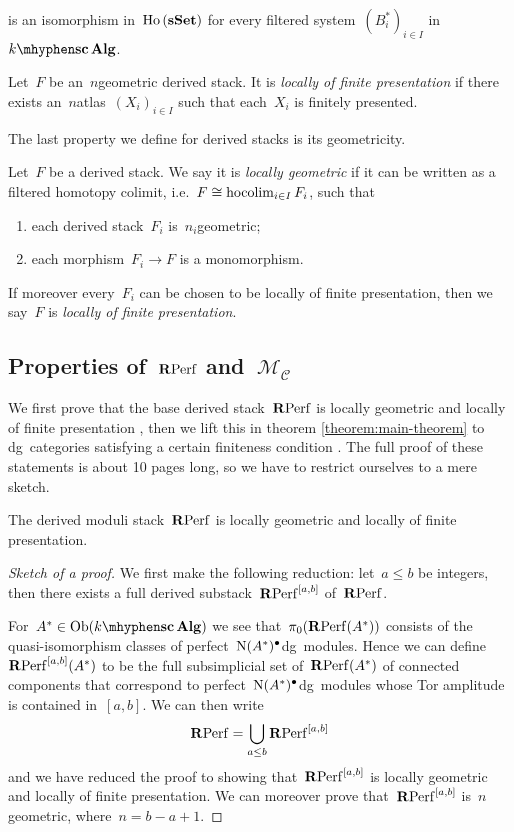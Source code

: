 \begin{refsection}
\begin{definition}
\begin{equation}
  \end{equation}
  is an isomorphism in~$\operatorname{\mathrm{Ho} \,}(\mathbf{s\,\!\mathbf{Set}})$ for every filtered system~$(B_i^*)_{i\in I}$ in~$\scAlg{k}$.
\end{definition}
\begin{definition}
  Let~$F$ be an~$n$\dash geometric derived stack. It is \emph{locally of finite presentation} if there exists an~$n$\dash atlas~$(X_i)_{i\in I}$ such that each~$X_i$ is finitely presented.
\end{definition}
The last property we define for derived stacks is its geometricity.
\begin{definition}
  Let~$F$ be a derived stack. We say it is \emph{locally geometric} if it can be written as a filtered homotopy colimit, i.e.\ $F\cong\operatorname*{hocolim}_{i\in I}F_i$, such that
  \begin{enumerate}
    \item each derived stack~$F_i$ is~$n_i$\dash geometric;
    \item each morphism~$F_i\to F$ is a monomorphism.
  \end{enumerate}
  If moreover every~$F_i$ can be chosen to be locally of finite presentation, then we say~$F$ is \emph{locally of finite presentation}.
\end{definition}

\subsection{Properties of~$\mathbf{R}\mathrm{Perf}$ and~$\mathcal{M}_{\mathcal{C}}$}
We first prove that the base derived stack~$\mathbf{R}\mathrm{Perf}$ is locally geometric and locally of finite presentation \cite[proposition 3.7]{toen-vaquie}, then we lift this in theorem \ref{theorem:main-theorem} to dg~categories satisfying a certain finiteness condition \cite[theorem 3.6]{toen-vaquie}. The full proof of these statements is about 10 pages long, so we have to restrict ourselves to a mere sketch.
\begin{theorem}
  \label{theorem:main-theorem-RPerf}
  The derived moduli stack~$\mathbf{R}\mathrm{Perf}$ is locally geometric and locally of finite presentation.

  \begin{proof}[Sketch of a proof]
    We first make the following reduction: let~$a\leq b$ be integers, then there exists a full derived substack~$\mathbf{R}\mathrm{Perf}^{[a,b]}$ of~$\mathbf{R}\mathrm{Perf}$.
    
    For~$A^*\in\Ob(\scAlg{k})$ we see that~$\pi_0(\mathbf{R}\mathrm{Perf}(A^*))$ consists of the quasi-isomorphism classes of perfect~$\operatorname{N}(A^*)^\bullet$\dash dg~modules. Hence we can define~$\mathbf{R}\mathrm{Perf}^{[a,b]}(A^*)$ to be the full subsimplicial set of~$\mathbf{R}\mathrm{Perf}(A^*)$ of connected components that correspond to perfect~$\operatorname{N}(A^*)^\bullet$\dash dg~modules whose Tor amplitude is contained in~$[a,b]$. We can then write
    \begin{equation}
      \mathbf{R}\mathrm{Perf}=\bigcup_{a\leq b}\mathbf{R}\mathrm{Perf}^{[a,b]}
    \end{equation}
    and we have reduced the proof to showing that~$\mathbf{R}\mathrm{Perf}^{[a,b]}$ is locally geometric and locally of finite presentation. We can moreover prove that~$\mathbf{R}\mathrm{Perf}^{[a,b]}$ is~$n$\dash geometric, where~$n=b-a+1$.


\end{proof}
\end{theorem}
\end{refsection}
